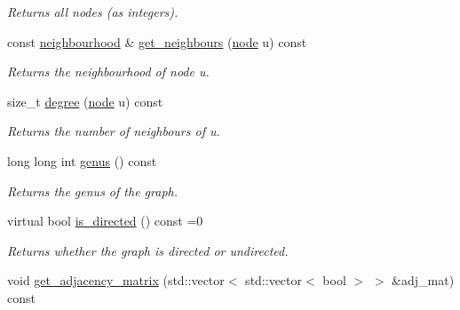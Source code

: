 \begin{DoxyCompactItemize}
\begin{DoxyCompactList}\small\item\em Returns all nodes (as integers). \end{DoxyCompactList}\item 
const \hyperlink{namespacelgraph_a052e7766c13f3a43cec0aec8173fdede}{neighbourhood} \& \hyperlink{classlgraph_1_1xxgraph_a8b6d2d8126d39fc4167e9b93af78d5fc}{get\-\_\-neighbours} (\hyperlink{namespacelgraph_a397169dd66adf725210a30fb7251773e}{node} u) const 
\begin{DoxyCompactList}\small\item\em Returns the neighbourhood of node u. \end{DoxyCompactList}\item 
size\-\_\-t \hyperlink{classlgraph_1_1xxgraph_a3106eaa7cc937f414c2281e542264883}{degree} (\hyperlink{namespacelgraph_a397169dd66adf725210a30fb7251773e}{node} u) const 
\begin{DoxyCompactList}\small\item\em Returns the number of neighbours of u. \end{DoxyCompactList}\item 
long long int \hyperlink{classlgraph_1_1xxgraph_ae758b0403a8a1d9b82a8859608f4049c}{genus} () const 
\begin{DoxyCompactList}\small\item\em Returns the genus of the graph. \end{DoxyCompactList}\item 
virtual bool \hyperlink{classlgraph_1_1xxgraph_a0a606d77cbbb2efa7056b82c3b8c395c}{is\-\_\-directed} () const =0
\begin{DoxyCompactList}\small\item\em Returns whether the graph is directed or undirected. \end{DoxyCompactList}\item 
\hypertarget{classlgraph_1_1xxgraph_a4161a548022795a068af53c76d504391}{void \hyperlink{classlgraph_1_1xxgraph_a4161a548022795a068af53c76d504391}{get\-\_\-adjacency\-\_\-matrix} (std\-::vector$<$ std\-::vector$<$ bool $>$ $>$ \&adj\-\_\-mat) const }\label{classlgraph_1_1xxgraph_a4161a548022795a068af53c76d504391}


\end{DoxyCompactItemize}
